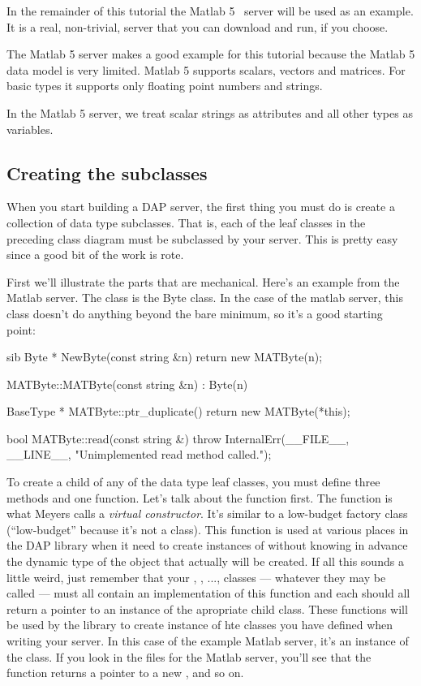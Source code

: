 \documentclass{dods-paper}
\begin{document}
In the remainder of this tutorial the Matlab 5 \opendap\ server will be used
as an example. It is a real, non-trivial, server that you can download and
run, if you choose.

The Matlab 5 server makes a good example for this tutorial because the Matlab
5 data model is very limited. Matlab 5 supports scalars, vectors and
matrices. For basic types it supports only floating point numbers and
strings.

In the Matlab 5 server, we treat scalar strings as attributes and all other
types as variables.

\subsection{Creating the subclasses}

When you start building a DAP server, the first thing you must do is
create a collection of data type subclasses. That is, each of the leaf
classes in the preceding class diagram must be subclassed by your
server. This is pretty easy since a good bit of the work is rote.

First we'll illustrate the parts that are mechanical. Here's an
example from the Matlab server. The class is the Byte class. In the
case of the matlab server, this class doesn't do anything beyond the
bare minimum, so it's a good starting point:

\begin{vcode}{sib}
Byte *
NewByte(const string &n)
{
    return new MATByte(n);
}

MATByte::MATByte(const string &n) : Byte(n)
{
}

BaseType *
MATByte::ptr_duplicate()
{
    return new MATByte(*this);
}

bool
MATByte::read(const string &)
{
    throw InternalErr(__FILE__, __LINE__, "Unimplemented read method
    called.");
}
\end{vcode}

To create a child of any of the data type leaf classes, you must define three
methods and one function. Let's talk about the function first. The function
 is what Meyers\cite{meyers:ecpp} calls a \emph{virtual
constructor}. It's similar to a low-budget factory class (``low-budget''
because it's not a class). This function is used at various places in the DAP
library when it need to create instances of  without knowing in
advance the dynamic type of the object that actually will be created. If all
this sounds a little weird, just remember that your , ,
...,  classes --- whatever they may be called --- must all contain
an implementation of this function and each should all return a pointer to an
instance of the apropriate child class. These functions will be used by the
library to create instance of hte classes you have defined when writing your
server. In this case of the example Matlab server, it's an instance of the
 class. If you look in the files for the Matlab server, you'll
see that the function  returns a pointer to a new ,
and so on.
\end{document}
